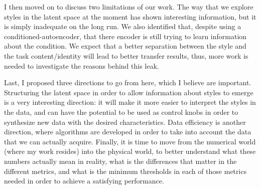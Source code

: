   \par I then moved on to discuss two limitations of our work. The way that we explore styles in the latent space at the moment has shown interesting information, but it is simply inadequate on the long run. We also identified that, despite using a conditioned-autoencoder, that there encoder is still trying to learn information about the condition. We expect that a better separation between the style and the task content/identity will lead to better transfer results, thus, more work is needed to investigate the reasons behind this leak.

  \par Last, I proposed three directions to go from here, which I believe are important. Structuring the latent space in order to allow information about styles to emerge is a very interesting direction: it will make it more easier to interpret the styles in the data, and can have the potential to be used as control knobs in order to synthesize new data with the desired characteristics. Data efficiency is another direction, where algorithms are developed in order to take into account the data that we can actually acquire. Finally, it is time to move from the numerical world (where my work resides) into the physical world, to better understand what these numbers actually mean in reality, what is the differences that matter in the different metrics, and what is the minimum thresholds in each of those metrics needed in order to achieve a satisfying performance.

